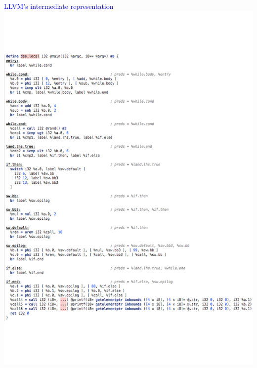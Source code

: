 \begin{frame}[fragile]{\textcolor{blue}{LLVM's intermediate representation}}
\includegraphics[scale=0.45]{src/example_ll.pdf} 
\end{frame}
